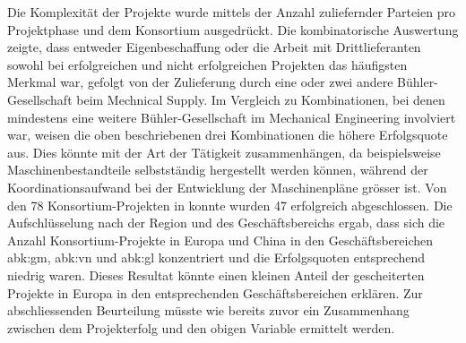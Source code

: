 Die Komplexität der Projekte wurde mittels der Anzahl zuliefernder Parteien pro Projektphase und dem Konsortium ausgedrückt. Die kombinatorische Auswertung zeigte, dass entweder Eigenbeschaffung oder die Arbeit mit Drittlieferanten sowohl bei erfolgreichen und nicht erfolgreichen Projekten das häufigsten Merkmal war, gefolgt von der Zulieferung durch eine oder zwei andere Bühler-Gesellschaft beim Mechnical Supply. Im Vergleich zu Kombinationen, bei denen mindestens eine weitere Bühler-Gesellschaft im Mechanical Engineering involviert war, weisen die oben beschriebenen drei Kombinationen die höhere Erfolgsquote aus. Dies könnte mit der Art der Tätigkeit zusammenhängen, da beispielsweise Maschinenbestandteile selbstständig hergestellt werden können, während der Koordinationsaufwand bei der Entwicklung der Maschinenpläne grösser ist.
\newline Von den 78 Konsortium-Projekten in konnte wurden 47 erfolgreich abgeschlossen. Die Aufschlüsselung nach der Region und des Geschäftsbereichs ergab, dass sich die Anzahl Konsortium-Projekte in Europa und China in den Geschäftsbereichen \gls{abk:gm}, \gls{abk:vn} und \gls{abk:gl} konzentriert und die Erfolgsquoten entsprechend niedrig waren. Dieses Resultat könnte einen kleinen Anteil der gescheiterten Projekte in Europa in den entsprechenden Geschäftsbereichen erklären. 
\newline Zur abschliessenden Beurteilung müsste wie bereits zuvor ein Zusammenhang zwischen dem Projekterfolg und den obigen Variable ermittelt werden.
\newline\newline
